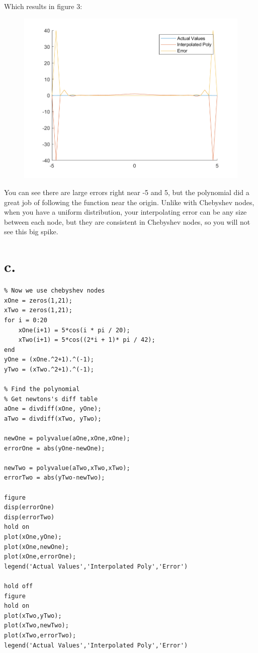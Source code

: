 \documentclass[]{article}
\begin{document}
Which results in figure 3:

\begin{figure}
\centering
\includegraphics{./Media/problem6Partb.png}
\caption{}
\end{figure}

You can see there are large errors right near -5 and 5, but the
polynomial did a great job of following the function near the origin.
Unlike with Chebyshev nodes, when you have a uniform distribution, your
interpolating error can be any size between each node, but they are
consistent in Chebyshev nodes, so you will not see this big spike.

\section{c.}\label{c.-1}

\begin{verbatim}
% Now we use chebyshev nodes
xOne = zeros(1,21);
xTwo = zeros(1,21);
for i = 0:20
    xOne(i+1) = 5*cos(i * pi / 20);
    xTwo(i+1) = 5*cos((2*i + 1)* pi / 42);
end
yOne = (xOne.^2+1).^(-1);
yTwo = (xTwo.^2+1).^(-1);

% Find the polynomial
% Get newtons's diff table
aOne = divdiff(xOne, yOne);
aTwo = divdiff(xTwo, yTwo);

newOne = polyvalue(aOne,xOne,xOne);
errorOne = abs(yOne-newOne);

newTwo = polyvalue(aTwo,xTwo,xTwo);
errorTwo = abs(yTwo-newTwo);

figure
disp(errorOne)
disp(errorTwo)
hold on
plot(xOne,yOne);
plot(xOne,newOne);
plot(xOne,errorOne);
legend('Actual Values','Interpolated Poly','Error')

hold off
figure
hold on
plot(xTwo,yTwo);
plot(xTwo,newTwo);
plot(xTwo,errorTwo);
legend('Actual Values','Interpolated Poly','Error')
\end{verbatim}
\end{document}
